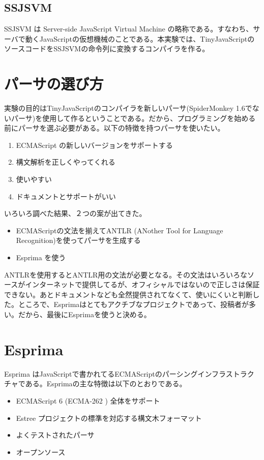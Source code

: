 \documentclass[12pt]{article}
\begin{document}
\subsection{SSJSVM}
SSJSVM は Server-side JavaScript Virtual Machine の略称である。すなわち、サーバで動くJavaScriptの仮想機械のことである。本実験では、TinyJavaScriptのソースコードをSSJSVMの命令列に変換するコンパイラを作る。

\section{パーサの選び方}
実験の目的はTinyJavaScriptのコンパイラを新しいパーサ(SpiderMonkey 1.6でないパーサ)を使用して作るということである。だから、プログラミングを始める前にパーサを選ぶ必要がある。以下の特徴を持つパーサを使いたい。

\begin{enumerate}
\item ECMAScript の新しいバージョンをサポートする
\item 構文解析を正しくやってくれる
\item 使いやすい
\item ドキュメントとサポートがいい
\end{enumerate}

いろいろ調べた結果、２つの案が出てきた。

\begin{itemize}
\item ECMAScriptの文法を揃えてANTLR\cite{antlr} (ANother Tool for Language Recognition)を使ってパーサを生成する
\item Esprima を使う
\end{itemize}

ANTLRを使用するとANTLR用の文法が必要となる。その文法はいろいろなソースがインターネットで提供してるが、オフィシャルではないので正しさは保証できない。あとドキュメントなども全然提供されてなくて、使いにくいと判断した。ところで、Esprimaはとてもアクチブなプロジェクトであって、投稿者が多い。だから、最後にEsprimaを使うと決める。

\section{Esprima}
Esprima \cite{esprima}はJavaScriptで書かれてるECMAScriptのパーシングインフラストラクチャである。Esprimaの主な特徴は以下のとおりである\cite{esprima}。

\begin{itemize}
\item ECMAScript 6 (ECMA-262 \cite{ecmascript}) 全体をサポート
\item Estree プロジェクトの標準を対応する構文木フォーマット
\item よくテストされたパーサ \cite{esprimaTests}
\item オープンソース \cite{esprimaGitHub}
\end{itemize}
\end{document}
